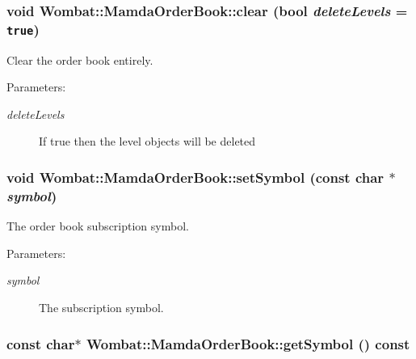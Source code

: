 \hypertarget{classWombat_1_1MamdaOrderBook_82295dc2807e8518049d57078acae9b0}{
\subsubsection[clear]{\setlength{\rightskip}{0pt plus 5cm}void Wombat::Mamda\-Order\-Book::clear (bool {\em delete\-Levels} = {\tt true})}}
\label{classWombat_1_1MamdaOrderBook_82295dc2807e8518049d57078acae9b0}


Clear the order book entirely. 

\begin{Desc}
\item[Parameters:]
\begin{description}
\item[{\em delete\-Levels}]If true then the level objects will be deleted \end{description}
\end{Desc}
\hypertarget{classWombat_1_1MamdaOrderBook_c8c0dc6087ad04b5baf3997a0fd6f2be}{
\subsubsection[setSymbol]{\setlength{\rightskip}{0pt plus 5cm}void Wombat::Mamda\-Order\-Book::set\-Symbol (const char $\ast$ {\em symbol})}}
\label{classWombat_1_1MamdaOrderBook_c8c0dc6087ad04b5baf3997a0fd6f2be}


The order book subscription symbol. 

\begin{Desc}
\item[Parameters:]
\begin{description}
\item[{\em symbol}]The subscription symbol. \end{description}
\end{Desc}
\hypertarget{classWombat_1_1MamdaOrderBook_7dcfefc45b555a316b294afcfd8d4046}{
\subsubsection[getSymbol]{\setlength{\rightskip}{0pt plus 5cm}const char$\ast$ Wombat::Mamda\-Order\-Book::get\-Symbol () const}}
\label{classWombat_1_1MamdaOrderBook_7dcfefc45b555a316b294afcfd8d4046}


